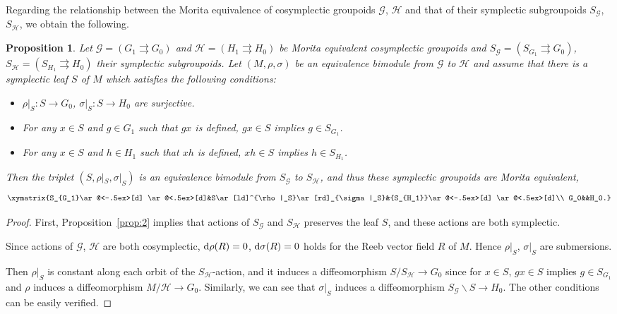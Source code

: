 \documentclass[10pt,a4paper]{amsart}
\numberwithin{equation}{section}
\newtheorem{Proposition}[Theorem]{Proposition}
{ \theoremstyle{definition}
\newtheorem{Definition}[Theorem]{Definition}
\newtheorem{Note}[Theorem]{Note}
\newtheorem{Example}[Theorem]{Example}
\newtheorem{Remark}[Theorem]{Remark} }
\begin{document}
Regarding the relationship between the Morita equivalence of cosymplectic groupoids $\mathcal{G}$, $\mathcal{H}$ and that of their symplectic subgroupoids $S_\mathcal{G}$, $S_\mathcal{H}$, we obtain the following.
\begin{Proposition}
 Let $\mathcal{G}=({G}_1\rightrightarrows G_0)$ and $\mathcal{H}=({H}_1\rightrightarrows H_0)$ be Morita equivalent cosymplectic groupoids and $S_\mathcal{G}=(S_{G_1}\rightrightarrows G_0)$, $S_\mathcal{H}=(S_{H_1}\rightrightarrows H_0)$ their symplectic subgroupoids. Let $(M,\rho,\sigma)$ be an equivalence bimodule from $\mathcal{G}$ to $\mathcal{H}$ and assume that there is a symplectic leaf $S$ of $M$ which satisfies the following conditions:
 \begin{itemize}\itemsep=0pt
 \item $\rho|_S\colon S\to G_0$, $ \sigma|_S\colon S\to H_0$ are surjective.
 \item For any $x\in S$ and $g\in G_1$ such that $gx$ is defined, $gx\in S$ implies $g\in S_{G_1}$.
 \item For any $x\in S$ and $h\in H_1$ such that $xh$ is defined, $xh\in S$ implies $h\in S_{H_1}$.
 \end{itemize}
 Then the triplet $(S,\rho|_S,\sigma|_S)$ is an equivalence bimodule from $S_\mathcal{G}$ to $S_\mathcal{H}$, and thus these symplectic groupoids are Morita equivalent,
 \[\xymatrix{S_{G_1}\ar@<-.5ex>[d] \ar@<.5ex>[d]&S\ar[ld]^{\rho|_S}\ar[rd]_{\sigma|_S}&{S_{H_1}}\ar@<-.5ex>[d] \ar@<.5ex>[d]\\
 G_0&&H_0.}\]
\end{Proposition}
\begin{proof}
 First, Proposition~\ref{prop:2} implies that actions of $S_{\mathcal{G}}$ and $S_\mathcal{H}$ preserves the leaf $S$, and these actions are both symplectic.

 Since actions of $\mathcal{G}$, $\mathcal{H}$ are both cosymplectic, ${\rm d}\rho(R)=0$, $ {\rm d}\sigma(R)=0$ holds for the Reeb vector field $R$ of $M$. Hence $\rho|_S$, $\sigma|_S$ are submersions.

 Then $\rho|_S$ is constant along each orbit of the $S_{\mathcal{H}}$-action, and it induces a diffeomorphism $S/S_{\mathcal{H}}\to G_0$ since for $x\in S$, $gx\in S$ implies $g\in S_{G_1}$ and $\rho$ induces a diffeomorphism $M/\mathcal{H}\to G_0$. Similarly, we can see that $\sigma|_S$ induces a diffeomorphism $S_{\mathcal{G}}\backslash S\to H_0$. The other conditions can be easily verified.
\end{proof}
\end{document}
